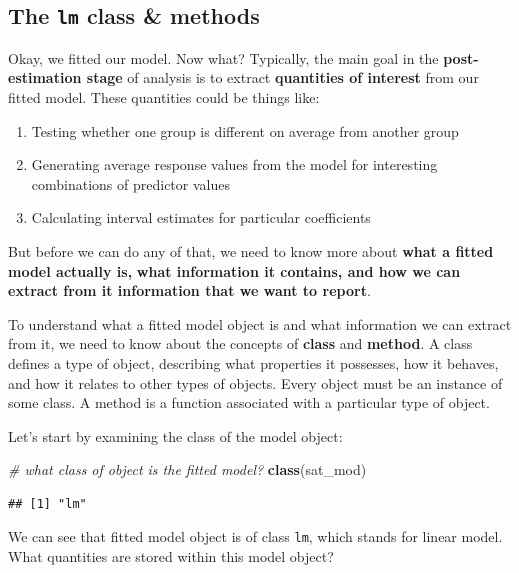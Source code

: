 \documentclass[
]{book}
\newenvironment{Shaded}{\begin{snugshade}}{\end{snugshade}}
\newcommand{\CommentTok}[1]{\textcolor[rgb]{0.56,0.35,0.01}{\textit{#1}}}
\newcommand{\KeywordTok}[1]{\textcolor[rgb]{0.13,0.29,0.53}{\textbf{#1}}}
\newcommand{\NormalTok}[1]{#1}
\providecommand{\tightlist}{%
  \setlength{\itemsep}{0pt}\setlength{\parskip}{0pt}}
\begin{document}
\hypertarget{the-lm-class-methods}{%
\subsection{\texorpdfstring{The \texttt{lm} class \& methods}{The lm class \& methods}}\label{the-lm-class-methods}}

Okay, we fitted our model. Now what? Typically, the main goal in the \textbf{post-estimation stage} of analysis
is to extract \textbf{quantities of interest} from our fitted model. These quantities could be things like:

\begin{enumerate}
\def\labelenumi{\arabic{enumi}.}
\tightlist
\item
  Testing whether one group is different on average from another group
\item
  Generating average response values from the model for interesting combinations of predictor values
\item
  Calculating interval estimates for particular coefficients
\end{enumerate}

But before we can do any of that, we need to know more about \textbf{what a fitted model actually is,}
\textbf{what information it contains, and how we can extract from it information that we want to report}.

To understand what a fitted model object is and what information we can extract from it, we need to know about the concepts of \textbf{class} and \textbf{method}. A class defines a type of object, describing what properties it possesses, how it behaves, and how it relates to other types of objects. Every object must be an instance of some class. A method is a function associated with a particular type of object.

Let's start by examining the class of the model object:

\begin{Shaded}
\begin{Highlighting}[]
  \CommentTok{\# what class of object is the fitted model?}
  \KeywordTok{class}\NormalTok{(sat\_mod)}
\end{Highlighting}
\end{Shaded}

\begin{verbatim}
## [1] "lm"
\end{verbatim}

We can see that fitted model object is of class \texttt{lm}, which stands for linear model. What quantities are stored within this model object?
\end{document}
